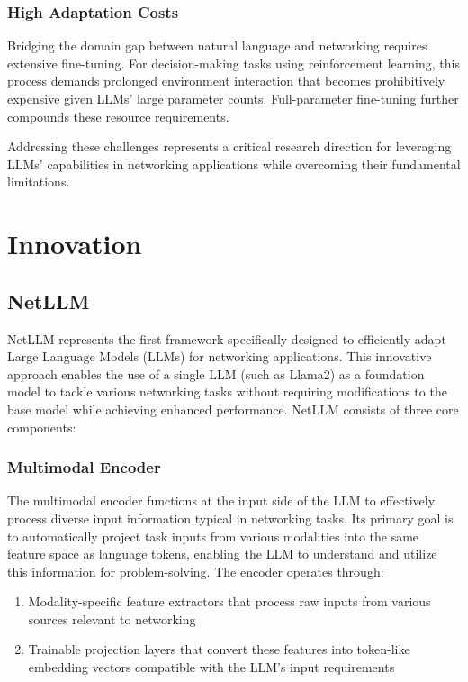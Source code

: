 \documentclass[twocolumn]{article}
\begin{document}
\subsubsection{High Adaptation Costs}
Bridging the domain gap between natural language and networking requires extensive fine-tuning. For decision-making tasks using reinforcement learning, this process demands prolonged environment interaction that becomes prohibitively expensive given LLMs' large parameter counts. Full-parameter fine-tuning further compounds these resource requirements.

Addressing these challenges represents a critical research direction for leveraging LLMs' capabilities in networking applications while overcoming their fundamental limitations.

\section{Innovation}

\subsection{NetLLM}

NetLLM represents the first framework specifically designed to efficiently adapt Large Language Models (LLMs) for networking applications. This innovative approach enables the use of a single LLM (such as Llama2) as a foundation model to tackle various networking tasks without requiring modifications to the base model while achieving enhanced performance. NetLLM consists of three core components:

\subsubsection{Multimodal Encoder}
The multimodal encoder functions at the input side of the LLM to effectively process diverse input information typical in networking tasks. Its primary goal is to automatically project task inputs from various modalities into the same feature space as language tokens, enabling the LLM to understand and utilize this information for problem-solving. The encoder operates through:

\begin{enumerate}[itemsep=0pt, topsep=2pt, parsep=0pt]
  \item Modality-specific feature extractors that process raw inputs from various sources relevant to networking
  \item Trainable projection layers that convert these features into token-like embedding vectors compatible with the LLM's input requirements
\end{enumerate}
\end{document}
